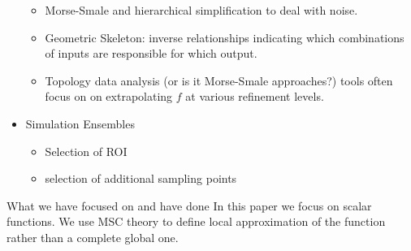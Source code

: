 \begin{itemize}[topsep=0cm, itemsep=0ex, parsep=0cm]
    \begin{itemize}
        \item Morse-Smale and hierarchical simplification to deal with noise.
        
         \item Geometric Skeleton: inverse relationships indicating which combinations of inputs are responsible for which output.
     
        \item Topology data analysis (or is it Morse-Smale approaches?) tools often focus on on extrapolating $f$ at various refinement levels.
    \end{itemize}

    \item Simulation Ensembles
    \begin{itemize}
        \item Selection of ROI
        \item selection of additional sampling points
    \end{itemize}
        
\end{itemize}

\item What we have focused on and have done
In this paper we focus on scalar functions. We use MSC theory to define local approximation of the function rather than a complete global one. 

